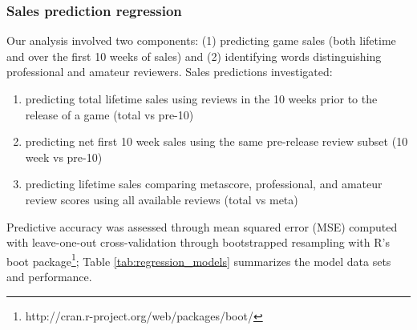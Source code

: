 \documentclass[letterpaper]{article}
\begin{document}
\subsubsection{Sales prediction regression}
Our analysis involved two components: (1) predicting game sales (both lifetime and over the first 10 weeks of sales) and (2) identifying words distinguishing professional and amateur reviewers. Sales predictions investigated: 
\begin{enumerate}
\item predicting total lifetime sales using reviews in the 10 weeks prior to the release of a game (total vs pre-10)
\item predicting net first 10 week sales using the same pre-release review subset (10 week vs pre-10)
\item predicting lifetime sales comparing metascore, professional, and amateur review scores using all available reviews (total vs meta)
\end{enumerate}
Predictive accuracy was assessed through mean squared error (MSE) computed with leave-one-out cross-validation through bootstrapped resampling with R's boot package\footnote{http://cran.r-project.org/web/packages/boot/}; Table \ref{tab:regression_models} summarizes the model data sets and performance.
\end{document}
